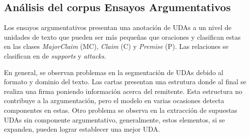 \documentclass[a4paper,11pt,twocolumn,twoside]{article}
\begin{document}
\subsection{Análisis del corpus Ensayos Argumentativos}


Los ensayos argumentativos presentan una anotación de UDAs a un nivel de unidades de texto que pueden ser 
más pequeñas que oraciones y clasifican estas en las clases \textit{MajorClaim} (MC), \textit{Claim} (C) y \textit{Premise}
(P). Las relaciones se clasifican en de \textit{supports} y \textit{attacks}. 

En general, se observan problemas en la segmentación de UDAs debido al formato y dominio del texto.
Las cartas presentan una estrutura donde al final se realiza una firma poniendo información acerca del remitente.
Esta estructura no contribuye a la argumentación, pero el modelo en varias ocasiones detecta componentes en estas. 
Otro problema se observa en la extracción de supuestas UDAs sin componente argumentativo,
generalmente, estos elementos, si se expanden, pueden lograr establecer una mejor UDA.
\end{document}
